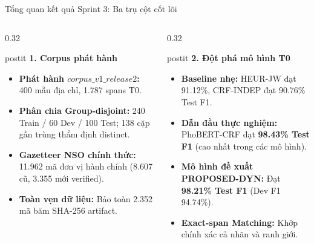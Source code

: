 \documentclass[aspectratio=169, 9pt]{beamer}
\begin{document}
\begin{frame}{Tổng quan kết quả Sprint 3: Ba trụ cột cốt lõi}
  \vspace{-0.15cm}
  \begin{columns}[T]
    \begin{column}{0.32\textwidth}
      \begin{beamercolorbox}[wd=\textwidth,rounded=true,shadow=false]{postit}
        \textbf{\color{bkblue}1. Corpus phát hành}
      \end{beamercolorbox}
      \vspace{0.05cm}
      {\fontsize{7.3pt}{9.2pt}\selectfont
      \begin{itemize}
        \setlength{\itemsep}{2pt}
        \item \textbf{Phát hành $corpus\_v1\_release2$:} 400 mẫu địa chỉ, 1.787 spans T0.
        \item \textbf{Phân chia Group-disjoint:} 240 Train / 60 Dev / 100 Test; 138 cặp gần trùng thẩm định distinct.
        \item \textbf{Gazetteer NSO chính thức:} 11.962 mã đơn vị hành chính (8.607 cũ, 3.355 mới verified).
        \item \textbf{Toàn vẹn dữ liệu:} Bảo toàn 2.352 mã băm SHA-256 artifact.
      \end{itemize}
      }
    \end{column}
    \begin{column}{0.32\textwidth}
      \begin{beamercolorbox}[wd=\textwidth,rounded=true,shadow=false]{postit}
        \textbf{\color{bkblue}2. Đột phá mô hình T0}
      \end{beamercolorbox}
      \vspace{0.05cm}
      {\fontsize{7.3pt}{9.2pt}\selectfont
      \begin{itemize}
        \setlength{\itemsep}{2pt}
        \item \textbf{Baseline nhẹ:} HEUR-JW đạt 91.12\%, CRF-INDEP đạt 90.76\% Test F1.
        \item \textbf{Dẫn đầu thực nghiệm:} PhoBERT-CRF đạt \textbf{98.43\% Test F1} (cao nhất trong các mô hình).
        \item \textbf{Mô hình đề xuất PROPOSED-DYN:} Đạt \textbf{98.21\% Test F1} (Dev F1 94.74\%).
        \item \textbf{Exact-span Matching:} Khớp chính xác cả nhãn và ranh giới.

\end{itemize}}
\end{column}
\end{columns}
\end{frame}
\end{document}
